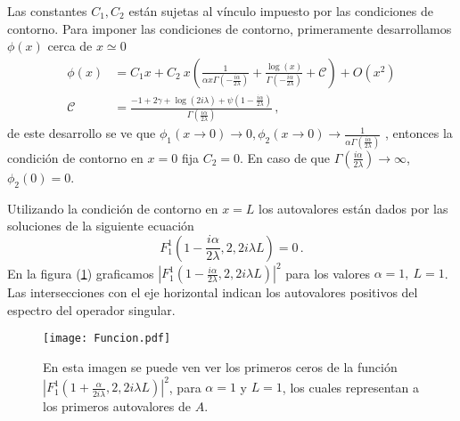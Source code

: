 Las constantes $C_1,C_2$ están sujetas al vínculo impuesto por las condiciones de contorno.
Para imponer las condiciones de contorno, primeramente desarrollamos $\phi (x)$ cerca de $x \simeq 0$ 
\begin{align}
\phi  ( x ) &=
C _1  x  + 
C _2 \ x 
\left( 
\frac{1}{  \alpha x  \Gamma ( - \frac{i \alpha}{2  \lambda}  )   }  +
\frac{\log (x) }{\Gamma ( - \frac{ i \alpha}{2 \lambda} ) } + \mathscr{C} \right) + O(x ^2)
	\nonumber
\\[10pt]
\mathscr{C} &= 
\frac{
-1 + 2 \gamma + \log ( 2  i \lambda ) + \psi (1 - \frac{i \alpha}{2 \lambda})
}
{\Gamma (\frac{i \alpha}{2 \lambda})}
\, ,
\label{eq.scat}
\end{align}
de este desarrollo se ve que $ \phi _1 (x \rightarrow 0 ) \rightarrow 0,\phi _2 (x \rightarrow 0)  \rightarrow
\frac{1}{  \alpha   \Gamma ( \frac{i \alpha}{2 \lambda}  )   } $ , entonces la condición de contorno en $x=0$ fija $C _2 =0$. En caso de que $\Gamma ( \frac{i \alpha}{2 \lambda}  ) \rightarrow \infty$, $\phi _2 (0) = 0$.


Utilizando la condición de contorno en $x=L$ los autovalores están dados por las soluciones de la siguiente ecuación
\begin{equation}
F _1 ^1 \left(1-\frac{i \alpha}{2 \lambda},2,2 i \lambda L \right)  = 0
	\, .
\label{eq.1}
\end{equation}
En la figura (\ref{fig:funcion}) graficamos
\mbox{$ | F _1 ^1 (1-\frac{i \alpha}{2 \lambda},2,2 i \lambda L) | ^2 $} para los valores  $\alpha=1, \ L=1$. Las intersecciones con el eje horizontal indican los autovalores positivos del espectro del operador singular.

\begin{figure}[h!]
\centering
\texttt{[image: Funcion.pdf]}
\caption{En esta imagen se puede ven ver los primeros ceros de la función $| F _1 ^1 (1+\frac{ \alpha}{2 i \lambda},2,2 i \lambda L) | ^2$, para $\alpha=1$ y $L=1$, los cuales representan a los primeros autovalores de $A$.}
\label{fig:funcion}
\end{figure}

